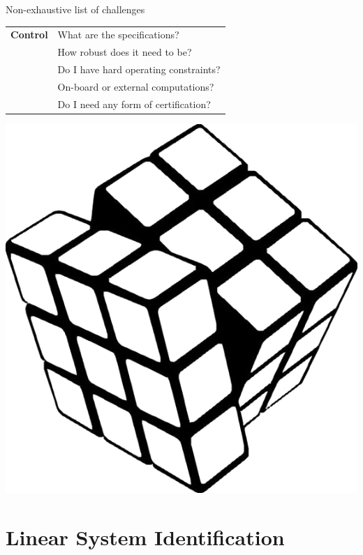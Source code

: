 \documentclass[aspectratio=169,compress,12pt,dvipsnames]{beamer}
\begin{document}
\begin{frame}[t, c]{Non-exhaustive list of challenges}
    \vfill
    \begin{minipage}{.68\textwidth}
        \centering
        \begin{tabular}{rl}
            \textbf{Control}    &   What are the specifications?            \\
                                &   How robust does it need to be?          \\
                                &   Do I have hard operating constraints?   \\
                                &   On-board or external computations?      \\
                                &   Do I need any form of certification?
        \end{tabular}
    \end{minipage}%
    \hfill
    \begin{minipage}{.28\textwidth}
        \centering
        \includegraphics[width=\textwidth]{rubik_cube.png}
    \end{minipage}
    \vfill
\end{frame}

\section{Linear System Identification}
\end{document}
